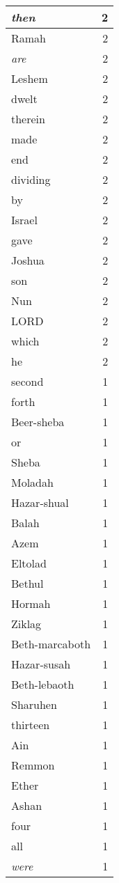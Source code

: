 \begin{center}
\begin{longtable}{l|r}
\emph{then} & 2\\ \hline 
Ramah & 2\\ \hline 
\emph{are} & 2\\ \hline 
Leshem & 2\\ \hline 
dwelt & 2\\ \hline 
therein & 2\\ \hline 
made & 2\\ \hline 
end & 2\\ \hline 
dividing & 2\\ \hline 
by & 2\\ \hline 
Israel & 2\\ \hline 
gave & 2\\ \hline 
Joshua & 2\\ \hline 
son & 2\\ \hline 
Nun & 2\\ \hline 
LORD & 2\\ \hline 
which & 2\\ \hline 
he & 2\\ \hline 
second & 1\\ \hline 
forth & 1\\ \hline 
Beer-sheba & 1\\ \hline 
or & 1\\ \hline 
Sheba & 1\\ \hline 
Moladah & 1\\ \hline 
Hazar-shual & 1\\ \hline 
Balah & 1\\ \hline 
Azem & 1\\ \hline 
Eltolad & 1\\ \hline 
Bethul & 1\\ \hline 
Hormah & 1\\ \hline 
Ziklag & 1\\ \hline 
Beth-marcaboth & 1\\ \hline 
Hazar-susah & 1\\ \hline 
Beth-lebaoth & 1\\ \hline 
Sharuhen & 1\\ \hline 
thirteen & 1\\ \hline 
Ain & 1\\ \hline 
Remmon & 1\\ \hline 
Ether & 1\\ \hline 
Ashan & 1\\ \hline 
four & 1\\ \hline 
all & 1\\ \hline 
\emph{were} & 1\\ \hline 

\end{longtable}
\end{center}
